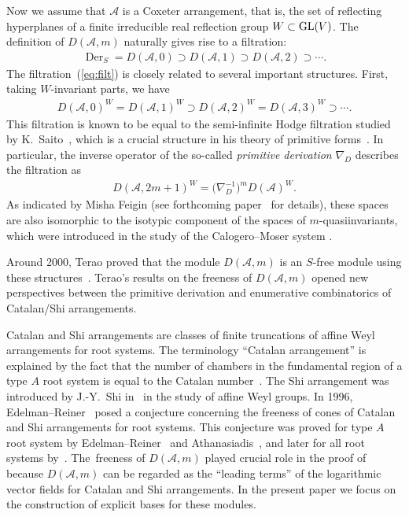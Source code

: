 \documentclass[10pt,a4paper]{amsart}
\numberwithin{equation}{section}
\newcommand{\A}{\mathcal{A}}
\newcommand{\Der}{\operatorname{Der}}
\begin{document}
Now we assume that $\A$ is a Coxeter arrangement, that is,
the set of reflecting hyperplanes of a finite irreducible real reflection group
$W\subset {\rm GL}(V)$.
The definition of $D(\A, m)$ naturally gives rise to a filtration:
\begin{gather}
\label{eq:filt}
\Der_S=D(\A, 0)\supset D(\A, 1)\supset D(\A, 2)\supset\cdots.
\end{gather}
The filtration~(\ref{eq:filt}) is closely related to several important structures.
First, taking $W$-invariant parts, we have
\begin{gather*}
D(\A, 0)^W= D(\A, 1)^W\supset D(\A, 2)^W= D(\A, 3)^W\supset\cdots.
\end{gather*}
This filtration is known to be equal to the semi-infinite Hodge filtration studied by
K.~Saito~\cite{sai-lin, sai-unif, ter-hodge, yos-prim},
which is a crucial structure in his theory
of primitive forms~\cite{sai-prim}.
In particular, the inverse operator of the
so-called \emph{primitive derivation} $\nabla_D$ describes the filtration as
\begin{gather*}
D(\A, 2m+1)^W=\big(\nabla_D^{-1}\big)^mD(\A)^W.
\end{gather*}
As indicated by Misha Feigin (see forthcoming paper~\cite{aefy} for details),
these spaces are also isomorphic
to the isotypic component of the spaces of $m$-quasiinvariants, which
were introduced in the study of the Calogero--Moser system
\cite{bm, cha-ves, fei-ves}.

Around 2000, Terao proved that the module $D(\A, m)$ is an
$S$-free module using these structures~\cite{ter-mult}.
Terao's results on the freeness of $D(\A, m)$ opened new perspectives
between the primitive derivation and enumerative combinatorics of
Catalan/Shi arrangements.

Catalan and Shi arrangements are classes of finite truncations of
affine Weyl arrangements for root systems.
The terminology ``Catalan arrangement''
is explained by the fact that the number of chambers in the fundamental
region of a type $A$ root system is equal to the Catalan number~\cite{ps-def}.
The Shi arrangement was introduced by J.-Y.~Shi in~\cite{shi-kl}
in the study of affine Weyl groups.
In 1996, Edelman--Reiner~\cite{ede-rei} posed a conjecture concerning the
freeness of cones of Catalan and Shi arrangements for root systems.
This conjecture was proved for type $A$ root system
by Edelman--Reiner~\cite{ede-rei} and
Athanasiadis~\cite{ath-free}, and later for all root systems by~\cite{yos-char}.
The~freeness of $D(\A, m)$ played crucial role in the proof of
\cite{yos-char} because $D(\A, m)$ can be regarded as the ``leading terms''
of the logarithmic vector fields for Catalan and Shi arrangements.
In the present paper we focus on the construction of explicit bases for
these modules.
\end{document}
